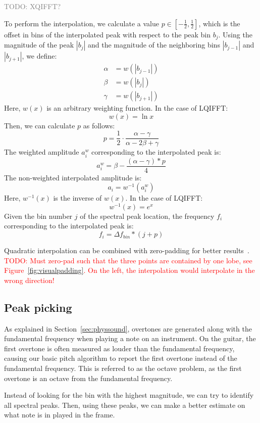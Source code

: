 \documentclass[10pt,twocolumn]{article}
\begin{document}
\textcolor{gray}{TODO: XQIFFT?}

To perform the interpolation, we calculate a value $p \in [-\frac{1}{2}, \frac{1}{2}]$, which is the offset in bins of the interpolated peak with respect to the peak bin $b_j$. Using the magnitude of the peak $|b_j|$ and the magnitude of the neighboring bins $|b_{j - 1}|$ and $|b_{j + 1}|$, we define:
\begin{align*}
    \alpha &= w(|b_{j - 1}|) \\
    \beta  &= w(|b_{j}|) \\
    \gamma &= w(|b_{j + 1}|)
\end{align*}
Here, $w(x)$ is an arbitrary weighting function. In the case of LQIFFT:
\[ w(x) = \ln{x} \]
Then, we can calculate $p$ as follows:
\[ p = \frac{1}{2} \cdot \frac{\alpha - \gamma}{\alpha - 2\beta + \gamma} \]
The weighted amplitude $a_i^w$ corresponding to the interpolated peak is:
\[ a_i^w = \beta - \frac{(\alpha - \gamma) * p}{4} \]
The non-weighted interpolated amplitude is:
\[ a_i = w^{-1}(a_i^w) \]
Here, $w^{-1}(x)$ is the inverse of $w(x)$. In the case of LQIFFT:
\[ w^{-1}(x) = e^{x} \]
Given the bin number $j$ of the spectral peak location, the frequency $f_i$ corresponding to the interpolated peak is:
\[ f_i = \Delta f_{bin} * (j + p) \]

Quadratic interpolation can be combined with zero-padding for better results~\cite{interpolnozero}.
\textcolor{red}{TODO: Must zero-pad such that the three points are contained by one lobe, see Figure~\ref{fig:visualpadding}. On the left, the interpolation would interpolate in the wrong direction!}

\subsection{Peak picking}
As explained in Section~\ref{sec:physsound}, overtones are generated along with the fundamental frequency when playing a note on an instrument. On the guitar, the first overtone is often measured as louder than the fundamental frequency, causing our basic pitch algorithm to report the first overtone instead of the fundamental frequency. This is referred to as the octave problem, as the first overtone is an octave from the fundamental frequency.

Instead of looking for the bin with the highest magnitude, we can try to identify all spectral peaks. Then, using these peaks, we can make a better estimate on what note is in played in the frame.
\end{document}
